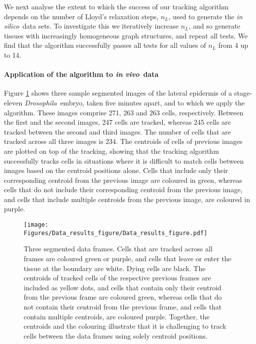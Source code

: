 \documentclass[a4paper,11pt]{article}
\newcommand{\Drosophila}{\textit{Drosophila}~}
\newcommand{\insilico}{\textit{in silico}~}
\newcommand{\invivo}{\textit{in vivo}~}
\begin{document}
We next analyse the extent to which the success of our tracking algorithm depends on the number of Lloyd's relaxation steps, $n_{L}$, used to generate the \insilico data sets. 
To investigate this we iteratively increase $n_{L}$, and so generate tissues with increasingly homogeneous graph structures, and repeat all tests.
We find that the algorithm successfully passes all tests for all values of $n_{L}$ from 4 up to 14.


\paragraph{Application of the algorithm to \invivo data}

Figure \ref{fig:data_results} shows three sample segmented images of the lateral epidermis of a stage-eleven \Drosophila embryo, taken five minutes apart, and to which we apply the algorithm. 
These images comprise 271, 263 and 263 cells, respectively.
Between the first and the second images, 247 cells are tracked, whereas 245 cells are tracked between the second and third images. 
The number of cells that are tracked across all three images is 234.  
The centroids of cells of previous images are plotted on top of the tracking, showing that the tracking algorithm successfully tracks cells in situations where it is difficult to match cells between images based on the centroid positions alone. 
Cells that include only their corresponding centroid from the previous image are coloured in green, whereas cells that do not include their corresponding centroid from the previous image, and cells that include multiple centroids from the previous image, are coloured in purple. 

\begin{figure}[h]
\centering
\texttt{[image: Figures/Data\_results\_figure/Data\_results\_figure.pdf]}
\caption{Three segmented data frames. 
Cells that are tracked across all frames are coloured green or purple, and cells that leave or enter the tissue at the boundary are white. 
Dying cells are black. 
The centroids of tracked cells of the respective previous frames are included as yellow dots, and cells that contain only their centroid from the previous frame are coloured green, whereas cells that do not contain their centroid from the previous frame, and cells that contain multiple centroids, are coloured purple. 
Together, the centroids and the colouring illustrate that it is challenging to track cells between the data frames using solely centroid positions.}
\label{fig:data_results}
\end{figure}
\end{document}
